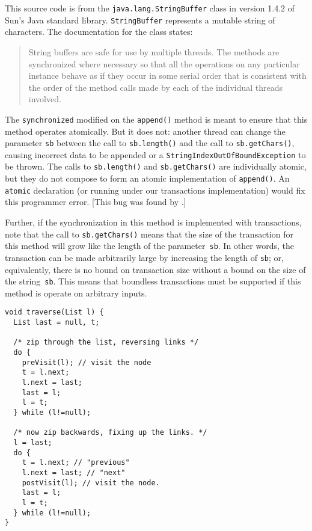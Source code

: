 \documentclass[preprint]{rdbacmconf}
\begin{document}
This  
source code is from the \texttt{java.lang.StringBuffer} class in
version 1.4.2 of Sun's Java standard library.  \texttt{StringBuffer}
represents a mutable string of characters.  The documentation for the
class states:
\par{\footnotesize
\begin{quote}
 String buffers are safe for use by multiple threads. The methods 
 are synchronized where necessary so that all the operations on any 
 particular instance behave as if they occur in some serial order 
 that is consistent with the order of the method calls made by each of 
 the individual threads involved. 
\end{quote}
}

The \texttt{synchronized} modified on the \texttt{append()} method is
meant to ensure that this method operates atomically.  But it does
not: another thread can change the parameter \texttt{sb} between the
call to \texttt{sb.length()} and the call to \texttt{sb.getChars()},
causing incorrect data to be appended or a
\texttt{StringIndexOutOfBoundException} to be thrown.  The calls to
\texttt{sb.length()} and \texttt{sb.getChars()} are individually
atomic, but they do not compose to form an atomic implementation of
\texttt{append()}.  An \texttt{atomic} declaration (or running under
our transactions implementation) would fix this programmer error.
[This bug was found by \cite{FlanaganQa03}.]

Further, if the synchronization in this method is implemented with
transactions, note that the call to \texttt{sb.getChars()} means that
the size of the transaction for this method will grow like the length
of the parameter~\texttt{sb}.  In other words, the transaction can be
made arbitrarily large by increasing the length of \texttt{sb}; or,
equivalently, there is no bound on transaction size without a bound on
the size of the string~\texttt{sb}.  This means that boundless
transactions must be supported if this method is operate on arbitrary
inputs.

\cite{SchorrWa67}

 \par {\footnotesize\samepage
\begin{verbatim}
void traverse(List l) {
  List last = null, t;
  
  /* zip through the list, reversing links */
  do {
    preVisit(l); // visit the node
    t = l.next;
    l.next = last;
    last = l;
    l = t;
  } while (l!=null);

  /* now zip backwards, fixing up the links. */
  l = last;
  do {
    t = l.next; // "previous"
    l.next = last; // "next"
    postVisit(l); // visit the node.
    last = l;
    l = t;
  } while (l!=null);
}
\end{verbatim}
}
\end{document}
